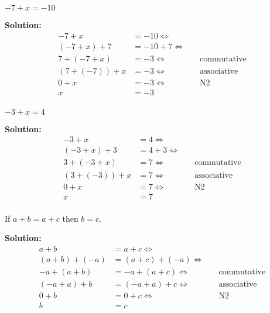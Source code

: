 \begin{tcolorbox}[title=Problem 20, breakable]
$-7 + x = -10$
\end{tcolorbox}

\textbf{Solution:}
\begin{align*}
-7 + x &= -10 \Leftrightarrow & \quad \text{} \\
(-7 + x) + 7 &= -10 + 7 \Leftrightarrow & \quad \text{} \\ 
7 + (-7 + x) &= -3 \Leftrightarrow & \quad \text{commutative}  \\ 
(7 + (-7)) + x &= -3 \Leftrightarrow & \quad \text{associative}  \\ 
0 + x &= -3 \Leftrightarrow & \quad \text{N2}  \\
x &= -3 & \quad \text{}  \\
\end{align*}


\begin{tcolorbox}[title=Problem 21, breakable]
$-3 + x = 4$
\end{tcolorbox}

\textbf{Solution:}
\begin{align*}
-3 + x &= 4 \Leftrightarrow & \quad \text{} \\
(-3 + x) + 3 &= 4 + 3 \Leftrightarrow & \quad \text{} \\
3 + (-3 + x) &= 7 \Leftrightarrow & \quad \text{commutative}  \\ 
(3 + (-3)) + x &= 7 \Leftrightarrow & \quad \text{associative}  \\ 
0 + x &= 7  \Leftrightarrow & \quad \text{N2}  \\
x &= 7 & \quad \text{}  \\
\end{align*}

\begin{tcolorbox}[title=22 Prove the cancellation law for addition, breakable]
If $a + b = a + c$ then $b = c$.
\end{tcolorbox}

\textbf{Solution:}
\begin{align*}
a + b &= a + c \Leftrightarrow & \quad \text{} \\
(a + b) + (-a) &= (a + c) + (-a) \Leftrightarrow & \quad \text{} \\
-a + (a + b) &= -a + (a + c) \Leftrightarrow & \quad \text{commutative}  \\ 
(-a + a) + b &= (-a + a) + c \Leftrightarrow & \quad \text{associative}  \\ 
0 + b &= 0 + c \Leftrightarrow & \quad \text{N2}  \\
b &= c & \quad \text{}  \\
\end{align*}


